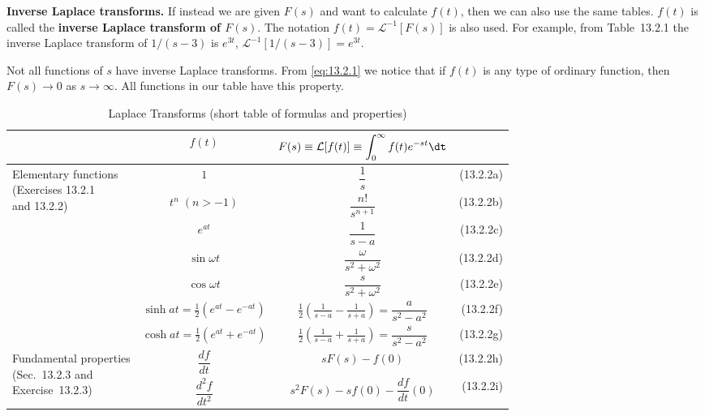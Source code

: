 \textbf{Inverse Laplace transforms.}
If instead we are given $F(s)$ and want to calculate $f(t)$, then we can also use the same tables.  $f(t)$ is called the \textbf{inverse Laplace transform of $F(s)$}.  The notation $f(t) = \mathcal{L}^{-1}[F(s)]$ is also used.
For example, from Table~13.2.1 the inverse Laplace transform of $1/(s-3)$ is $e^{3t}$,
$\mathcal{L}^{-1}[1/(s-3)] = e^{3t}$.

Not all functions of $s$ have inverse Laplace transforms.  From \eqref{eq:13.2.1} we notice that if $f(t)$ is any type of ordinary function, then $F(s) \to 0$ as $s \to \infty$.  All functions in our table have this property.

\begin{table}[H]
\centering
\caption{Laplace Transforms (short table of formulas and properties)}
\label{tab:13.2.1}
\renewcommand{\arraystretch}{1.4}
\begin{tabular}{@{}lcc@{\qquad}r@{}}
\toprule
& $f(t)$ & $F(s) \equiv \mathcal{L}[f(t)] \equiv \displaystyle\int_0^{\infty} f(t)e^{-st}\dt$ & \\
\midrule
\multirow{7}{*}{\parbox{3cm}{Elementary functions\\(Exercises 13.2.1\\and 13.2.2)}}
 & $1$ & $\dfrac{1}{s}$ & (13.2.2a) \\[6pt]
 & $t^n\;(n > -1)$ & $\dfrac{n!}{s^{n+1}}$ & (13.2.2b) \\[6pt]
 & $e^{at}$ & $\dfrac{1}{s-a}$ & (13.2.2c) \\[6pt]
 & $\sin\omega t$ & $\dfrac{\omega}{s^2+\omega^2}$ & (13.2.2d) \\[6pt]
 & $\cos\omega t$ & $\dfrac{s}{s^2+\omega^2}$ & (13.2.2e) \\[6pt]
 & $\sinh at = \tfrac{1}{2}(e^{at}-e^{-at})$
   & $\tfrac{1}{2}\!\left(\tfrac{1}{s-a}-\tfrac{1}{s+a}\right) = \dfrac{a}{s^2-a^2}$
   & (13.2.2f) \\[6pt]
 & $\cosh at = \tfrac{1}{2}(e^{at}+e^{-at})$
   & $\tfrac{1}{2}\!\left(\tfrac{1}{s-a}+\tfrac{1}{s+a}\right) = \dfrac{s}{s^2-a^2}$
   & (13.2.2g) \\[6pt]
\midrule
\multirow{5}{*}{\parbox{3cm}{Fundamental properties\\(Sec.~13.2.3 and\\Exercise~13.2.3)}}
 & $\dfrac{df}{dt}$ & $sF(s) - f(0)$ & (13.2.2h) \\[6pt]
 & $\dfrac{d^2 f}{dt^2}$ & $s^2 F(s) - sf(0) - \dfrac{df}{dt}(0)$ & (13.2.2i) \\[6pt]

\end{tabular}
\end{table}
